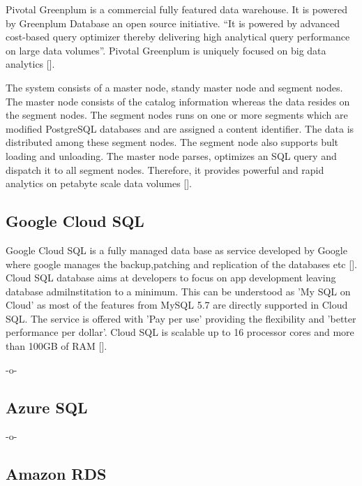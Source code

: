 Pivotal Greenplum is a commercial fully featured data warehouse. It is
powered by Greenplum Database an open source initiative. ``It is
powered by advanced cost-based query optimizer thereby delivering high
analytical query performance on large data volumes''. Pivotal
Greenplum is uniquely focused on big data analytics [\cite{pivotal.io}].

The system consists of a master node, standy master node and segment
nodes. The master node consists of the catalog information whereas the
data resides on the segment nodes.  The segment nodes runs on one or
more segments which are modified PostgreSQL databases and are assigned
a content identifier. The data is distributed among these segment
nodes. The segment node also supports bult loading and unloading. The
master node parses, optimizes an SQL query and dispatch it to all
segment nodes. Therefore, it provides powerful and rapid analytics on
petabyte scale data volumes [\cite{pivotal_wikipedia}].
     
\subsection{Google Cloud SQL}
     
Google Cloud SQL is a fully managed data base as service developed by
Google where google manages the backup,patching and replication of the
databases etc [\cite{www-cloud-sql-google}]. Cloud SQL database aims at
developers to focus on app development leaving database
admilnstitation to a minimum. This can be understood as 'My SQL on
Cloud' as most of the features from MySQL 5.7 are directly supported
in Cloud SQL. The service is offered with 'Pay per use' providing the
flexibility and 'better performance per dollar'.  Cloud SQL is
scalable up to 16 processor cores and more than 100GB of
RAM [\cite{www-cloud-sql-google-faq}].

     -o-
      
\subsection{Azure SQL}

-o- 

\subsection{Amazon RDS }

